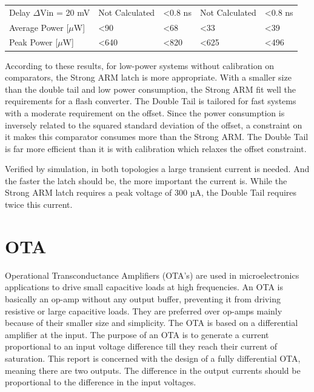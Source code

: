 \begin{table}[ht]
\begin{tabular}{@{}lllll@{}}
    Delay \(\Delta\)Vin = 20 mV                                                                                   & Not Calculated                            & \textless 0.8 ns              & Not Calculated              & \textless 0.8 ns              \\
    Average Power {[}\(\mu\)W{]}                                                                               & \textless 90                 & \textless 68                  & \textless 33                & \textless 39                  \\
    Peak Power {[}\(\mu\)W{]}                                                                                  & \textless 640                & \textless 820                 & \textless 625               & \textless 496                 \\ \bottomrule
    \end{tabular}
    \end{table}

According to these results, for low-power systems without calibration on comparators, the Strong ARM latch is more appropriate. With a smaller size than the double tail and low power consumption, the Strong ARM fit well the requirements for a flash converter.
The Double Tail is tailored for fast systems with a moderate requirement on the offset. Since the power consumption is inversely related to the squared standard deviation of the offset, a constraint on it makes this comparator consumes more than the Strong ARM\@. The Double Tail is far more efficient than it is with calibration which relaxes the offset constraint.

Verified by simulation, in both topologies a large transient current is needed. And the faster the latch should be, the more important the current is. While the Strong ARM latch requires a peak voltage of 300 µA, the Double Tail requires twice this current.

\section{OTA}                              %
Operational Transconductance Amplifiers (OTA's) are used in microelectronics applications to drive small capacitive loads at high frequencies. An OTA is basically an op-amp without any output buffer, preventing it from driving resistive or large capacitive loads. They are preferred over op-amps mainly because of their smaller size and simplicity. The OTA is based on a differential amplifier at the input. The purpose of an OTA is to generate a current proportional to an input voltage difference till they reach their current of saturation. This report is concerned with the design of a fully differential OTA, meaning there are two outputs. The difference in the output currents should be proportional to the difference in the input voltages.
